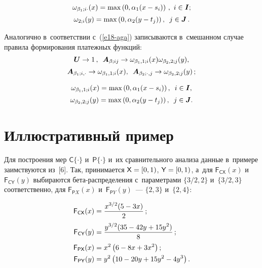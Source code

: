 \begin{multicols}{2}
  \noindent
  \begin{multline*}
  \omega_{\beta_1;i\cdot}(x)=\max \left( 0,\alpha_1(x-s_i)\right)\,,\
  i\in \bm{I};\\[2pt]
   \omega_{2;i}(y)=\max \left( 0,\alpha_2(y-t_j)\right), \enskip j\in \bm{J}\,.
  \end{multline*}
  
  Аналогично в~соответствии с~(\ref{e18-aga}) записываются в~смешанном 
случае правила формирования платежных функций: 
  \begin{multline*}
  \bm{U}\to 1\,,\enskip \bm{A}_{\beta;ij}\to \omega_{\beta_1,1;i}(x)\omega_{\beta_2,2;j}(y),\\[2pt]
  \bm{A}_{\beta_1;i,\cdot}\to \omega_{\beta_1,1;i}(x),\enskip
  \bm{A}_{\beta_2;\cdot,j}\to \omega_{\beta_2,2;j}(y)\,;
  \end{multline*}
  
  \vspace*{-12pt}
  
  \noindent
  \begin{multline}
  \omega_{\beta_1,1;i}(x)=\max \left( 0,\alpha_1(x-s_i)\right),\enskip i\in \bm{I},\\[2pt]
  \omega_{\beta_2,2;j}(y)=\max \left( 0,\alpha_2(y-t_j)\right),\enskip j\in\bm{J}.
  \label{e21-aga}
  \end{multline}
  
  \section{Иллюстративный пример}
  
  \vspace*{-1pt}
  
  Для построения мер ${\mathsf C}\{\cdot\}$ и~${\mathsf P}\{\cdot\}$ и~их 
сравнительного анализа данные в~примере заимствуются из~[6]. Так, 
принимается ${\mathsf X}\hm=[0,1)$, ${\mathsf Y}\hm=[0,1)$, а~для ${\mathsf 
F}_{\mathsf {CX}}(x)$ и~${\mathsf F}_{\mathsf{CY}}(y)$ выбираются  
бе\-та-рас\-пре\-де\-ле\-ния с~па\-ра\-мет\-ра\-ми $\{3/2,2\}$ и~$\{3/2,3\}$ 
соответственно, для ${\mathsf F}_{\mathsf PX}(x)$ и~${\mathsf F}_{\mathsf PY}(y)$~--- $\{2,3\}$ и~$\{2,4\}$:

\vspace*{-2pt}

\noindent
  \begin{align*}
  {\mathsf F}_{\mathsf {CX}} (x) &= \displaystyle\frac{\displaystyle x^{3/2}(5-3x)\mathstrut}{\displaystyle 2\mathstrut}\,;\\  
  {\mathsf F}_{\mathsf {CY}}(y)&= \displaystyle\frac{\displaystyle y^{3/2}(35-42y+15y^2)\mathstrut}{\displaystyle 8\mathstrut}\,;\\
  {\mathsf F}_{\mathsf {PX}}(x) &= x^2\left(6-8x+3x^2\right);\\
  {\mathsf F}_{\mathsf {PY}}(y)&= y^2\left( 10-20y+15y^2-4y^3\right).
  \end{align*}
  

\end{multicols}

